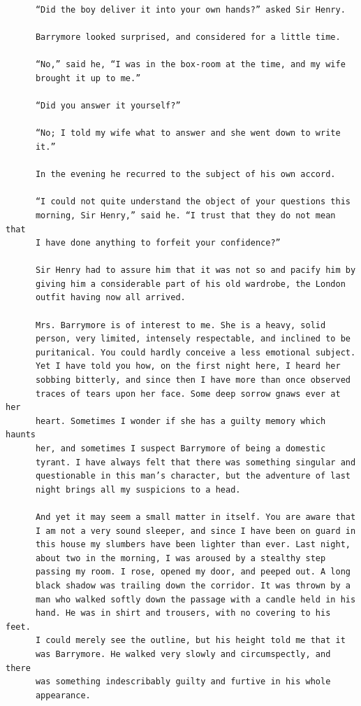\documentclass{article}
\begin{document}
\begin{verbatim}
      “Did the boy deliver it into your own hands?” asked Sir Henry.

      Barrymore looked surprised, and considered for a little time.

      “No,” said he, “I was in the box-room at the time, and my wife
      brought it up to me.”

      “Did you answer it yourself?”

      “No; I told my wife what to answer and she went down to write
      it.”

      In the evening he recurred to the subject of his own accord.

      “I could not quite understand the object of your questions this
      morning, Sir Henry,” said he. “I trust that they do not mean that
      I have done anything to forfeit your confidence?”

      Sir Henry had to assure him that it was not so and pacify him by
      giving him a considerable part of his old wardrobe, the London
      outfit having now all arrived.

      Mrs. Barrymore is of interest to me. She is a heavy, solid
      person, very limited, intensely respectable, and inclined to be
      puritanical. You could hardly conceive a less emotional subject.
      Yet I have told you how, on the first night here, I heard her
      sobbing bitterly, and since then I have more than once observed
      traces of tears upon her face. Some deep sorrow gnaws ever at her
      heart. Sometimes I wonder if she has a guilty memory which haunts
      her, and sometimes I suspect Barrymore of being a domestic
      tyrant. I have always felt that there was something singular and
      questionable in this man’s character, but the adventure of last
      night brings all my suspicions to a head.

      And yet it may seem a small matter in itself. You are aware that
      I am not a very sound sleeper, and since I have been on guard in
      this house my slumbers have been lighter than ever. Last night,
      about two in the morning, I was aroused by a stealthy step
      passing my room. I rose, opened my door, and peeped out. A long
      black shadow was trailing down the corridor. It was thrown by a
      man who walked softly down the passage with a candle held in his
      hand. He was in shirt and trousers, with no covering to his feet.
      I could merely see the outline, but his height told me that it
      was Barrymore. He walked very slowly and circumspectly, and there
      was something indescribably guilty and furtive in his whole
      appearance.


\end{verbatim}
\end{document}

